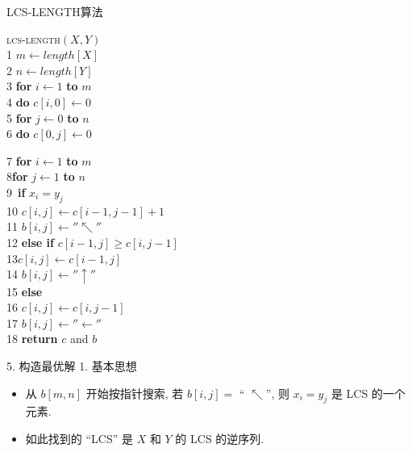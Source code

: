 \documentclass[fontset=fandol,UTF8,fleqn]{beamer}
\begin{document}
\begin{frame}{\textsf{LCS-LENGTH}算法}

\textsc{lcs-length}$(X,Y)$\\
1 $m\gets  length[X]$\\
2 $n\gets  length[Y]$\\
3  \textbf{for} $i\gets  1$ \textbf{to} $m$\\
4 \qquad \textbf{do} $c[i,0]\gets  0$\\
5 \textbf{for} $j\gets  0$ \textbf{to} $n$\\
6 \qquad \textbf{do} $c[0, j]\gets  0$\\
\end{frame}

\begin{frame}{}
7  \textbf{for} $i\gets 1$ \textbf{to} $m$\\
8\qquad \qquad \textbf{for} $j\gets  1$ \textbf{to} $n$\\
9\ \qquad \qquad \qquad \textbf{if} $x_i = y_j$\\
10 \qquad \qquad \qquad \qquad  $c[i, j]\gets
c[i - 1, j -1] + 1$\\
11 \qquad \qquad \qquad \qquad $b[i, j]\gets  ''\nwarrow ''$\\
12 \qquad \qquad \qquad \textbf{else if} $c[i - 1, j]\geq  c[i, j - 1]$\\
13\qquad \qquad \qquad \qquad  $c[i, j]\gets  c[i - 1, j]$\\
14  \qquad \qquad \qquad \qquad $b[i, j]\gets  ''\uparrow ''$\\
15  \qquad \qquad \qquad \textbf{else} \\
16 \qquad \qquad \qquad\qquad $c[i, j]\gets c[i, j -1]$\\
17  \qquad \qquad \qquad \qquad $b[i, j]\gets  ''\leftarrow ''$\\
18  \textbf{return} $c$ and $b$
\end{frame}

\begin{frame}{5. 构造最优解}
1. 基本思想
  \begin{itemize}[<+-|alert@+>]
\item 从 $b[m,n]$ 开始按指针搜索, 若 $b[i,j] =$ `` $ \nwarrow$'', 则 $x_i=y_j$ 是 LCS 的一个元素.
\item 如此找到的 ``LCS'' 是 $X$ 和 $Y$ 的 LCS 的逆序列.
\end{itemize}
\end{frame}
\end{document}
